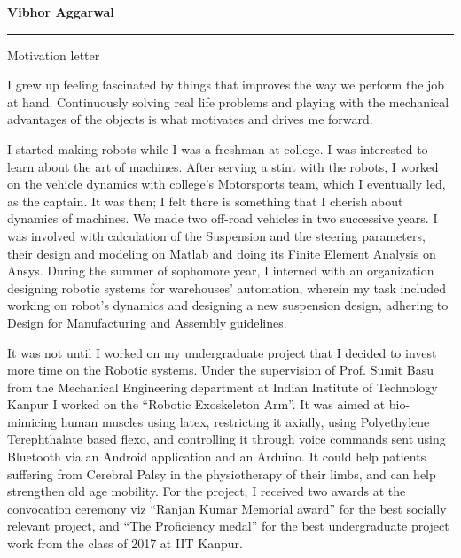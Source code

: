 \documentclass{letter} %
\date{ } %
\begin{document}
\longindentation=0pt                       %
\let\raggedleft\raggedright                %
 
\begin{letter}


\begin{center}
{\large\bf Vibhor Aggarwal} 
\end{center}
\medskip\hrule height 1pt
\begin{center}
{Motivation letter } 
\end{center} \vspace{0.5 cm} %
I grew up feeling fascinated by things that improves the way we perform the job at hand. Continuously solving real life problems and playing with the mechanical advantages of the objects is what motivates and drives me forward.

I started making robots while I was a freshman at college. I was interested to learn about the art of machines. After serving a stint with the robots, I worked on the vehicle dynamics with college’s Motorsports team, which I eventually led, as the captain. It was then; I felt there is something that I cherish about dynamics of machines. We made two off-road vehicles in two successive years. I was involved with calculation of the Suspension and the steering parameters, their design and modeling on Matlab and doing its Finite Element Analysis on Ansys. During the summer of sophomore year, I interned with an organization designing robotic systems for warehouses’ automation, wherein my task included working on robot’s dynamics and designing a new suspension design, adhering to Design for Manufacturing and Assembly guidelines.
 
It was not until I worked on my undergraduate project that I decided to invest more time on the Robotic systems. Under the supervision of Prof. Sumit Basu from the Mechanical Engineering department at Indian Institute of Technology Kanpur I worked on the “Robotic Exoskeleton Arm”. It was aimed at bio-mimicing human muscles using latex, restricting it axially, using Polyethylene Terephthalate based flexo, and controlling it through voice commands sent using Bluetooth via an Android application and an Arduino. It could help patients suffering from Cerebral Palsy in the physiotherapy of their limbs, and can help strengthen old age mobility. For the project, I received two awards at the convocation ceremony viz “Ranjan Kumar Memorial award” for the best socially relevant project, and “The Proficiency medal” for the best undergraduate project work from the class of 2017 at IIT Kanpur. 


\end{letter}
\end{document}

